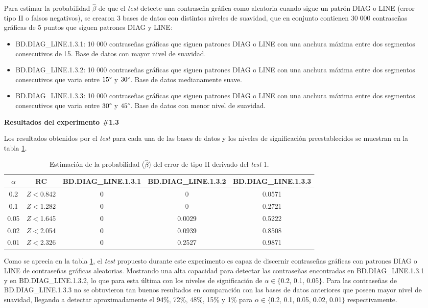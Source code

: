 \documentclass[12pt]{report}
\begin{document}
Para estimar la probabilidad $\hat{\beta}$ de que el \textit{test} detecte una contraseña gráfica como aleatoria cuando sigue un patrón DIAG o LINE  (error tipo II o falsos negativos), se crearon 3 bases de datos con distintos niveles de suavidad, que en conjunto contienen 30 000 contraseñas gráficas de 5 puntos que siguen patrones DIAG y LINE:
\begin{itemize}
	\item BD.DIAG\_LINE.1.3.1: 10 000 contraseñas gráficas que siguen patrones DIAG o LINE con una anchura máxima entre dos segmentos consecutivos de 15\degree. Base de datos con mayor nivel de suavidad. 
	\item BD.DIAG\_LINE.1.3.2: 10 000 contraseñas gráficas que siguen patrones DIAG o LINE con una anchura máxima entre dos segmentos consecutivos que varia entre $15\degree$ y $30\degree$. Base de datos medianamente suave.
	\item BD.DIAG\_LINE.1.3.3: 10 000 contraseñas gráficas que siguen patrones DIAG o LINE con una anchura máxima entre dos segmentos consecutivos que varia entre $30\degree$ y $45\degree$. Base de datos con menor nivel de suavidad.
\end{itemize}
\textbf{Resultados del experimento \#1.3}

Los resultados obtenidos por el \textit{test}  para cada una de las bases de datos y los  niveles de significación preestablecidos se muestran en la tabla \ref{tab:error2-prob}.

\begin{table}[h!]
	\centering
	\begin{tabular}{|c|c|ccc|}
		\hline
		 $\alpha$&	RC &BD.DIAG\_LINE.1.3.1 & BD.DIAG\_LINE.1.3.2 & BD.DIAG\_LINE.1.3.3  \\
		\hline
		0.2 & $Z<$0.842 &0     & 0          & 0.0571     \\
		0.1 & $Z<$1.282   &0     & 0          & 0.2721     \\
		0.05 &$Z<$1.645 &0     & 0.0029    & 0.5222     \\
		0.02 &$Z<$2.054  &0     & 0.0939    & 0.8508     \\
		0.01 &$Z<$2.326  &0     & 0.2527    & 0.9871     \\
		\hline
	\end{tabular}
	\caption{Estimación de la probabilidad ($\hat{\beta}$) del error de tipo II derivado del \textit{test} 1.}
	\label{tab:error2-prob}
\end{table}
Como se aprecia en la tabla \ref{tab:error2-prob}, el \textit{test} propuesto durante este experimento es capaz de discernir contraseñas gráficas con patrones DIAG o LINE de contraseñas gráficas aleatorias. Mostrando una alta capacidad para detectar las contraseñas encontradas en BD.DIAG\_LINE.1.3.1 y en BD.DIAG\_LINE.1.3.2, lo que para esta última con los niveles de significación de $\alpha \in \{$0.2, 0.1, 0.05$\}$. Para las contraseñas de BD.DIAG\_LINE.1.3.3 no se obtuvieron tan buenos resultados en comparación con las bases de datos anteriores que poseen mayor nivel de suavidad, llegando a detectar aproximadamente el 94\%, 72\%, 48\%, 15\% y 1\%  para $\alpha \in \{$0.2, 0.1, 0.05, 0.02, 0.01$\}$ respectivamente.
\end{document}

